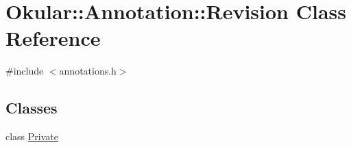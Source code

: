 \hypertarget{classOkular_1_1Annotation_1_1Revision}{\section{Okular\+:\+:Annotation\+:\+:Revision Class Reference}
\label{classOkular_1_1Annotation_1_1Revision}
}


{\ttfamily \#include $<$annotations.\+h$>$}

\subsection*{Classes}
\begin{DoxyCompactItemize}
\item 
class \hyperlink{classAnnotation_1_1Revision_1_1Private}{Private}
\end{DoxyCompactItemize}
